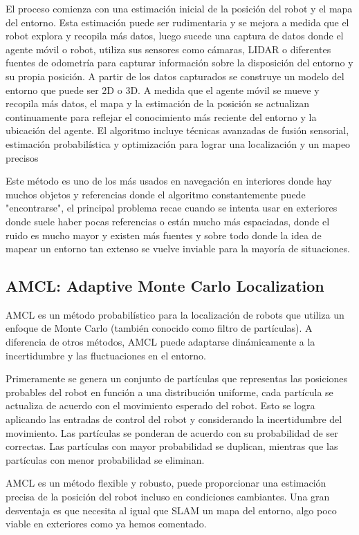 El proceso comienza con una estimación inicial de la posición del robot y el mapa del entorno. Esta estimación puede ser rudimentaria y 
se mejora a medida que el robot explora y recopila más datos, luego sucede una captura de datos donde el agente móvil o robot, utiliza sus 
sensores como cámaras, LIDAR o diferentes fuentes de odometría para capturar información sobre la disposición del entorno y su propia 
posición. A partir de los datos capturados se construye un modelo del entorno que puede ser 2D o 3D. A medida que el agente móvil se mueve 
y recopila más datos, el mapa y la estimación de la posición se actualizan continuamente para reflejar el conocimiento más reciente del 
entorno y la ubicación del agente. El algoritmo incluye técnicas avanzadas de fusión sensorial, estimación probabilística y optimización 
para lograr una localización y un mapeo precisos

Este método es uno de los más usados en navegación en interiores donde hay muchos objetos y referencias donde el algoritmo constantemente 
puede "encontrarse", el principal problema recae cuando se intenta usar en exteriores donde suele haber pocas referencias o están mucho más 
espaciadas, donde el ruido es mucho mayor y existen más fuentes y sobre todo donde la idea de mapear un entorno tan extenso se vuelve 
inviable para la mayoría de situaciones.

\subsection{AMCL: Adaptive Monte Carlo Localization}

AMCL es un método probabilístico para la localización de robots que utiliza un enfoque de Monte Carlo (también conocido como filtro de 
partículas). A diferencia de otros métodos, AMCL puede adaptarse dinámicamente a la incertidumbre y las fluctuaciones en el entorno. 

Primeramente se genera un conjunto de partículas que representas las posiciones probables del robot en función a una distribución uniforme, 
cada partícula se actualiza de acuerdo con el movimiento esperado del robot. Esto se logra aplicando las entradas de control del robot y 
considerando la incertidumbre del movimiento. Las partículas se ponderan de acuerdo con su probabilidad de ser correctas. Las partículas 
con mayor probabilidad se duplican, mientras que las partículas con menor probabilidad se eliminan. 

AMCL es un método flexible y robusto, puede proporcionar una estimación precisa de la posición del robot incluso en condiciones cambiantes. 
Una gran desventaja es que necesita al igual que SLAM un mapa del entorno, algo poco viable en exteriores como ya hemos comentado.

